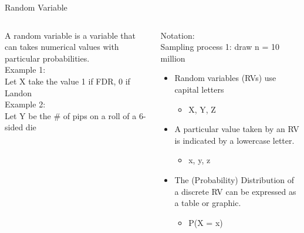 \documentclass[aspectratio=169]{../latex_main/tntbeamer}  %
\begin{document}
	
	\begin{frame}{Random Variable}
	    \begin{columns}
	        \begin{column}{.4\textwidth}
	            A random variable is a variable that can takes numerical values with particular probabilities.\\
	            \bigskip
	            Example 1:\\
                Let X take the value 1 if FDR, 0 if Landon\\
                \bigskip
                Example 2:\\
                Let Y be the \# of pips on a roll of a 6-sided die
	        \end{column}
	        
	        \begin{column}{.4\textwidth}
	           Notation:\\
	           Sampling process 1: draw n = 10 million
                \begin{itemize}
                    \item Random variables (RVs) use capital letters
                    \begin{itemize}
                        \item X, Y, Z
                    \end{itemize}
                    \item A particular value taken by an RV is indicated by a lowercase letter.
                    \begin{itemize}
                        \item x, y, z
                    \end{itemize}
                    \item The (Probability) Distribution of a discrete RV can be expressed as a table or graphic.
                    \begin{itemize}
                        \item P(X = x)
                    \end{itemize}
                \end{itemize}
	        \end{column}
	    \end{columns}
	\end{frame}
	
	
	
\end{document}
